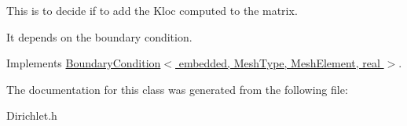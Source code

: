 This is to decide if to add the Kloc computed to the matrix. 

It depends on the boundary condition. 

Implements \hyperlink{class_boundary_condition_aba7cce27bd46f51026701a11ddca04f8}{Boundary\+Condition$<$ embedded, Mesh\+Type, Mesh\+Element, real $>$}.



The documentation for this class was generated from the following file\+:\begin{DoxyCompactItemize}
\item 
Dirichlet.\+h\end{DoxyCompactItemize}
